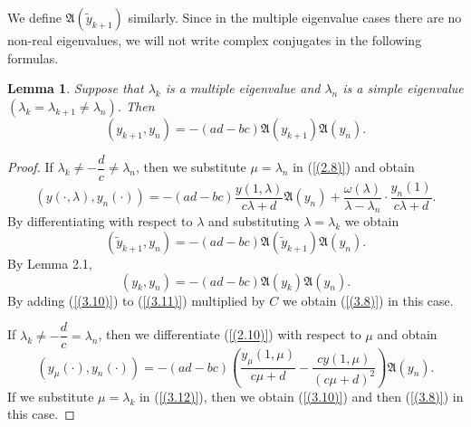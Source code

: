 \documentclass[pdflatex,sn-mathphys-num]{sn-jnl}%
\theoremstyle{thmstyleone}%
\theoremstyle{thmstyletwo}%
\theoremstyle{thmstylethree}%
\newtheorem{lem}[thm]{Lemma}
\theoremstyle{definition}
\theoremstyle{remark}
\numberwithin{equation}{section}
\begin{document}
We define $\mathfrak{A}(\tilde{y}_{k+1})$ similarly. Since in the multiple eigenvalue cases there are no non-real eigenvalues, we will not write complex conjugates in the following formulas.
\begin{lem} Suppose that \(\lambda_{k}\) is a multiple  eigenvalue and \(\lambda_{n}\) is a simple  eigenvalue \((\lambda_{k}=\lambda_{k+1}\ne\lambda_{n})\). Then 
\begin{equation}
\left( y_{k + 1},y_{n} \right) = - (ad - bc)\mathfrak{A}(y_{k+1})\mathfrak{A}(y_{n}). \label{(3.8)}
\end{equation}
\end{lem}

\begin{proof}
If $\lambda_k \neq -\dfrac{d}{c}\neq\lambda_n$, then we substitute $\mu=\lambda_n$ in (\ref{(2.8)}) and obtain 
\begin{equation}
\left(y(\cdot,\lambda), y_n(\cdot)\right)
= -(ad - bc)\frac{y(1,\lambda)}{c\lambda + d}\mathfrak{A}(y_{n})+ \frac{\omega(\lambda)}{\lambda - \lambda_n} \cdot \frac{y_n(1)}{c\lambda + d}.\label{(3.9)}
\end{equation}
By differentiating with respect to $\lambda$ and substituting $\lambda=\lambda_k$ we obtain 
\begin{equation}
\left( \tilde{y}_{k + 1},y_{n} \right) = - (ad - bc)\mathfrak{A}(\tilde{y}_{k+1})\mathfrak{A}(y_{n}). \label{(3.10)}
\end{equation}
By Lemma 2.1,
\begin{equation}
\left({y}_{k},y_{n} \right) = - (ad - bc)\mathfrak{A}({y}_{k})\mathfrak{A}(y_{n}). \label{(3.11)}
\end{equation}
By adding (\ref{(3.10)}) to  (\ref{(3.11)}) multiplied by $C$ we obtain (\ref{(3.8)}) in this case.

If $\lambda_k \neq -\dfrac{d}{c}=\lambda_n$, then we differentiate (\ref{(2.10)}) with respect to $\mu$ and obtain
\begin{equation}
\left(y_\mu(\cdot), y_n(\cdot)\right)
= -(ad - bc)\left(\frac{{y_\mu(1,\mu)}}{c\mu + d}-\frac{{cy(1,\mu)}}{(c\mu + d)^2}\right)\mathfrak{A}({y}_{n}). \label{(3.12)}
\end{equation}
If we substitute $\mu=\lambda_k$ in (\ref{(3.12)}), then we obtain (\ref{(3.10)}) and then (\ref{(3.8)}) in this case.


\end{proof}
\end{document}
